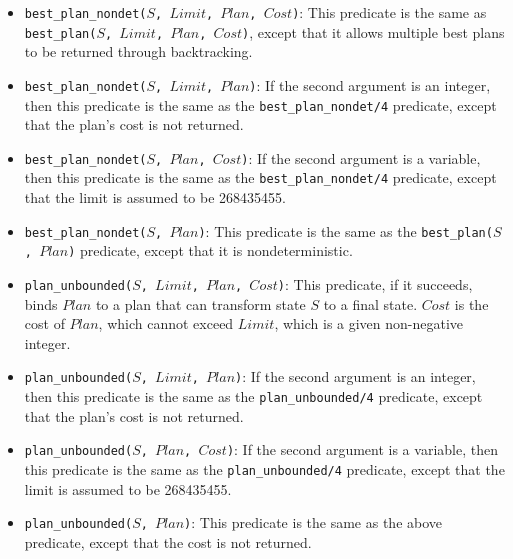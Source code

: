 \begin{itemize}
\item \texttt{best\_plan\_nondet($S$, $Limit$, $Plan$, $Cost$)}: This predicate is the same as \\\texttt{best\_plan($S$, $Limit$, $Plan$, $Cost$)}, except that it allows multiple best plans to be returned through backtracking.

\item \texttt{best\_plan\_nondet($S$, $Limit$, $Plan$)}: If the second argument is an integer, then this predicate is the same as the \texttt{best\_plan\_nondet/4} predicate, except that the plan's cost is not returned. 

\item \texttt{best\_plan\_nondet($S$, $Plan$, $Cost$)}: If the second argument is a variable, then this predicate is the same as the \texttt{best\_plan\_nondet/4} predicate, except that the limit is assumed to be 268435455.

\item \texttt{best\_plan\_nondet($S$, $Plan$)}: This predicate is the same as the \texttt{best\_plan($S$, $Plan$)} predicate, except that it is nondeterministic.

\item \texttt{plan\_unbounded($S$, $Limit$, $Plan$, $Cost$)}: This predicate, if it succeeds, binds $Plan$ to a plan that can transform state $S$ to a final state. $Cost$ is the cost of $Plan$, which cannot exceed $Limit$, which is a given non-negative integer.

\item \texttt{plan\_unbounded($S$, $Limit$, $Plan$)}: If the second argument is an integer, then this predicate is the same as the \texttt{plan\_unbounded/4} predicate, except that the plan's cost is not returned. 

\item \texttt{plan\_unbounded($S$, $Plan$, $Cost$)}: If the second argument is a variable, then this predicate is the same as the \texttt{plan\_unbounded/4} predicate, except that the limit is assumed to be 268435455.

\item \texttt{plan\_unbounded($S$, $Plan$)}: This predicate is the same as the above predicate, except that the cost is not returned.


\end{itemize}
